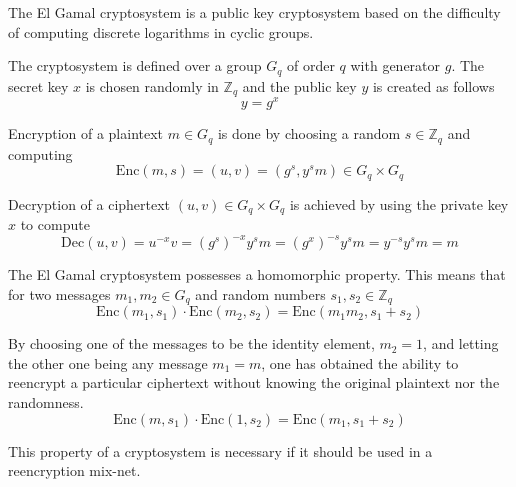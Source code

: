 The El Gamal cryptosystem is a public key cryptosystem based on the
difficulty of computing discrete logarithms in cyclic groups.

The cryptosystem is defined over a group $G_q$ of order $q$ with
generator $g$. The secret key $x$ is chosen randomly in $\mathbb{Z}_q$
and the public key $y$ is created as follows
$$
y = g^x
$$

Encryption of a plaintext $m \in G_q$ is done by choosing a random $s
\in \mathbb{Z}_q$ and computing
$$
\mathrm{Enc}(m,s) = (u,v) = (g^s, y^sm) \in G_q \times G_q
$$

Decryption of a ciphertext $(u,v) \in G_q \times G_q$ is achieved by
using the private key $x$ to compute
$$ 
\mathrm{Dec}(u,v) = u^{-x}v = (g^s)^{-x}y^sm = (g^x)^{-s}y^sm = y^{-s}y^sm = m
$$

The El Gamal cryptosystem possesses a homomorphic property. This means
that for two messages $m_1,m_2 \in G_q$ and random numbers $s_1, s_2
\in \mathbb{Z}_q$
$$
\mathrm{Enc}(m_1,s_1) \cdot \mathrm{Enc}(m_2,s_2) = \mathrm{Enc}(m_1m_2,s_1 + s_2)
$$

By choosing one of the messages to be the identity element, $m_2 = 1$,
and letting the other one being any message $m_1 = m$, one has
obtained the ability to reencrypt a particular ciphertext without
knowing the original plaintext nor the randomness. 
$$
\mathrm{Enc}(m,s_1) \cdot \mathrm{Enc}(1,s_2) = \mathrm{Enc}(m_1, s_1 + s_2)
$$

This property of a cryptosystem is necessary if it should be used in a
reencryption mix-net.


\begin{center}
\end{center}
